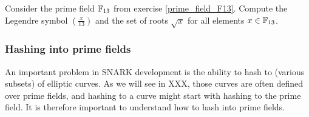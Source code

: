 \begin{exercise}
Consider the prime field $\mathbb{F}_{13}$ from exercise \ref{prime_field_F13}. Compute the Legendre symbol $\left(\frac{x}{13} \right)$ and the set of roots $\sqrt{x}$ for all elements $x\in \mathbb{F}_{13}$. 
\end{exercise}
%

\subsubsection{Hashing into prime fields}\label{hashing-prime-fields}
An important problem in SNARK development is the ability to hash to (various subsets) of elliptic curves. As we will see in XXX, those curves are often defined over prime fields, and hashing to a curve might start with hashing to the prime field. It is therefore important to understand how to hash into prime fields.

